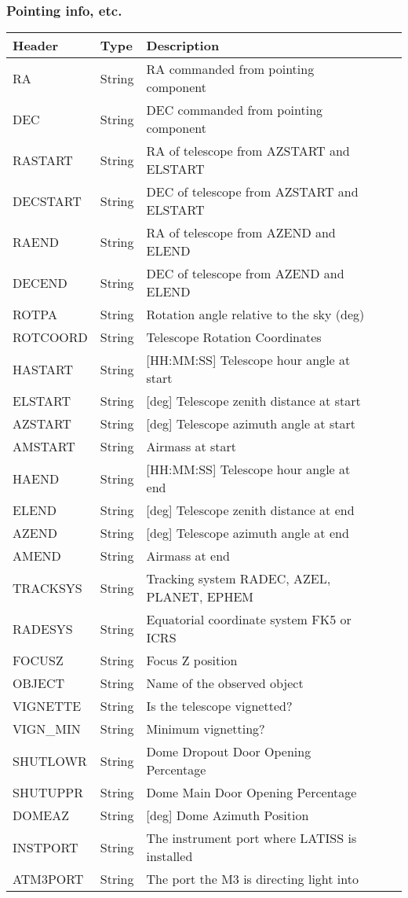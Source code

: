 \subsubsection{Pointing info, etc.}
\begin{tabular}{l l l l l}

\hline
Header & Type & Description \\
\hline
RA & String & RA commanded from pointing component \\
DEC & String & DEC commanded from pointing component \\
RASTART & String & RA of telescope from AZSTART and ELSTART \\
DECSTART & String & DEC of telescope from AZSTART and ELSTART \\
RAEND & String & RA of telescope from AZEND and ELEND \\
DECEND & String & DEC of telescope from AZEND and ELEND \\
ROTPA & String & Rotation angle relative to the sky (deg) \\
ROTCOORD & String & Telescope Rotation Coordinates \\
HASTART & String & [HH:MM:SS] Telescope hour angle at start \\
ELSTART & String & [deg] Telescope zenith distance at start \\
AZSTART & String & [deg] Telescope azimuth angle at start \\
AMSTART & String & Airmass at start \\
HAEND & String & [HH:MM:SS] Telescope hour angle at end \\
ELEND & String & [deg] Telescope zenith distance at end \\
AZEND & String & [deg] Telescope azimuth angle at end \\
AMEND & String & Airmass at end \\
TRACKSYS & String & Tracking system RADEC, AZEL, PLANET, EPHEM \\
RADESYS & String & Equatorial coordinate system FK5 or ICRS \\
FOCUSZ & String & Focus Z position \\
OBJECT & String & Name of the observed object \\
VIGNETTE & String & Is the telescope vignetted? \\
VIGN\_MIN & String & Minimum vignetting? \\
SHUTLOWR & String & Dome Dropout Door Opening Percentage \\
SHUTUPPR & String & Dome Main Door Opening Percentage \\
DOMEAZ & String & [deg] Dome Azimuth Position \\
INSTPORT & String & The instrument port where LATISS is installed \\
ATM3PORT & String & The port the M3 is directing light into \\
\hline
\end{tabular}


